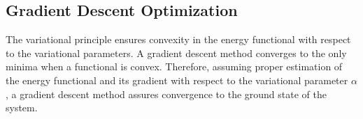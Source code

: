
\subsection{Gradient Descent Optimization}\label{sec:gradient_descent}

The variational principle ensures convexity in the energy functional with respect to the variational parameters. A gradient descent method converges to the only minima when a functional is convex. Therefore, assuming proper estimation of the energy functional and its gradient with respect to the variational parameter $\alpha$, a gradient descent method assures convergence to the ground state of the system. 


